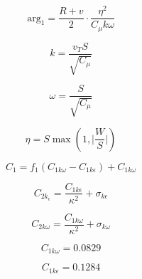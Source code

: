 {\newpage\clearpage
{}%
\begin{displaymath}
\text{arg}_{1}=\frac{R+v}{2}\cdot\frac{\eta ^{2}}{C_{\mu }k\omega }
\end{displaymath}%
\lthtmldisplayZ
\lthtmlcheckvsize\clearpage}

{\newpage\clearpage
{}%
\begin{displaymath}
k=\frac{v_{T}S}{\sqrt{C_{\mu }}}
\end{displaymath}%
\lthtmldisplayZ
\lthtmlcheckvsize\clearpage}

{\newpage\clearpage
{}%
\begin{displaymath}
\omega =\frac{S}{\sqrt{C_{\mu }}}
\end{displaymath}%
\lthtmldisplayZ
\lthtmlcheckvsize\clearpage}

{\newpage\clearpage
{}%
\begin{displaymath}
\eta =S\max (1, \vert \frac{W}{S}\vert )
\end{displaymath}%
\lthtmldisplayZ
\lthtmlcheckvsize\clearpage}

{\newpage\clearpage
{}%
\begin{displaymath}
C_{1}=f_{1}(C_{1k\omega }-C_{1k\epsilon })+C_{1k\omega }
\end{displaymath}%
\lthtmldisplayZ
\lthtmlcheckvsize\clearpage}

{\newpage\clearpage
{}%
\begin{displaymath}
C_{2k_{\epsilon}}=\frac{C_{1k\epsilon }}{\kappa ^{2}}+ \sigma _{k\epsilon }
\end{displaymath}%
\lthtmldisplayZ
\lthtmlcheckvsize\clearpage}

{\newpage\clearpage
{}%
\begin{displaymath}
C_{2k\omega }=\frac{C_{1k\omega }}{\kappa ^{2}}+ \sigma _{k\omega }
\end{displaymath}%
\lthtmldisplayZ
\lthtmlcheckvsize\clearpage}

{\newpage\clearpage
{}%
\begin{displaymath}
C_{1k\omega }=0.0829
\end{displaymath}%
\lthtmldisplayZ
\lthtmlcheckvsize\clearpage}

{\newpage\clearpage
{}%
\begin{displaymath}
C_{1k\epsilon }=0.1284
\end{displaymath}%
\lthtmldisplayZ
\lthtmlcheckvsize\clearpage}

